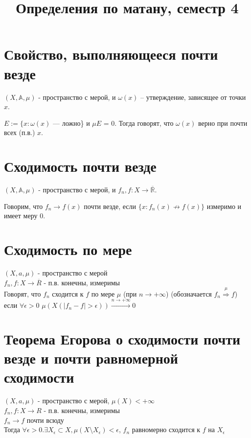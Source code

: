 \documentclass[paper=a4, fontsize=17pt]{article}
\title{Определения по матану, семестр 4}
\begin{document}
	\maketitle
	\tableofcontents
	\newpage
	
	\section{Свойство, выполняющееся почти везде}
	$ (X,\mathds{A},\mu)$  - пространство с мерой, и $\omega (x)$  -- утверждение, зависящее от точки $x$.
	
	$E := \{x: \omega(x) $ --- ложно\} и $\mu E$ = 0. Тогда говорят, что $\omega (x)$ верно при почти всех (п.в.) $x$.
	
	\section{Сходимость почти везде}
	$ (X,\mathds{A},\mu)$  - пространство с мерой, и $f_n, f: X \rightarrow \overline{\mathds{R}}.$
	
	Говорим, что $f_n \rightarrow f(x)$ почти везде, если $\{x: f_n(x) \not \rightarrow f(x)\}$ измеримо и имеет меру $0$.
	
	\section{Сходимость по мере}
	$(X, a, \mu)$ - пространство с мерой \\
	$f_n , f : X \rightarrow \overline R$ - п.в. конечны, измеримы\\
	Говорят, что $f_n$ сходится к $f$ по мере $\mu$ (при $n \rightarrow +\infty$) (обозначается $f_n\stackrel{\mu}{\Rightarrow}f$) если $\forall\epsilon > 0$ $\mu(X(|f_n - f| > \epsilon))\stackrel{n\rightarrow+\infty}{\rightarrow} 0$
	
	\section{Теорема Егорова о сходимости почти везде и почти равномерной сходимости}
	$(X, a, \mu)$ - пространство с мерой, $\mu(X) < + \infty$\\
	$f_n , f : X \rightarrow R$ - п.в. конечны, измеримы \\
	$f_n \rightarrow f$ почти всюду \\
	Тогда $\forall \epsilon > 0. \exists X_{\epsilon} \subset X, \mu(X \setminus X_{\epsilon}) < \epsilon$, $f_n$ равномерно сходится к $f$ на $X_{\epsilon}$
	
\end{document}
